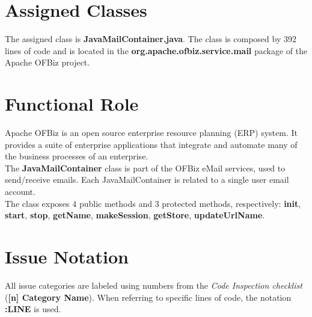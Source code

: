 \section{Assigned Classes}
The assigned class is \textbf{JavaMailContainer.java}. The class is composed by 392 lines of code and is located in the \textbf{org.apache.ofbiz.service.mail} package of the Apache OFBiz project.

\section{Functional Role}
Apache OFBiz is an open source enterprise resource planning (ERP) system. It provides a suite of enterprise applications that integrate and automate many of the business processes of an enterprise. \\
The \textbf{JavaMailContainer} class is part of the OFBiz eMail services, used to send/receive emails. Each JavaMailContainer is related to a single user email account.\\
The class exposes 4 public methods and 3 protected methods, respectively: \textbf{init}, \textbf{start}, \textbf{stop}, \textbf{getName}, \textbf{makeSession}, \textbf{getStore}, \textbf{updateUrlName}.


\section{Issue Notation}
All issue categories are labeled using numbers from the \textit{Code Inspection checklist}\cite{sw-eng2-ci} (\textbf{[n] Category Name}). When referring to specific lines of code, the notation \textbf{:LINE} is used.